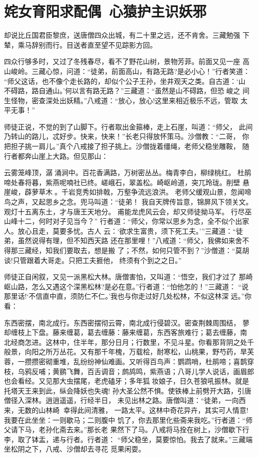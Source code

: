 \chapter{姹女育阳求配偶~心猿护主识妖邪}

却说比丘国君臣黎庶，送唐僧四众出城，有二十里之远，还不肯舍。三藏勉强
下辇，乘马辞别而行。目送者直至望不见踪影方回。

四众行够多时，又过了冬残春尽，看不了野花山树，景物芳菲。前面又见一座
高山峻岭。三藏心惊，问道：“徒弟，前面高山，有路无路?是必小心！”行者笑道：
“师父这话，也不像个走长路的，却似个公子王孙，坐井观天之类。自古道：‘山
不碍路，路自通山。’何以言有路无路？”三藏道：“虽然是山不碍路，但恐峻之
间生怪物，密查深处出妖精。”八戒道：“放心，放心!这里来相近极乐不远，管取
太平无事！”

师徒正说，不觉的到了山脚下。行者取出金箍棒，走上石崖，叫道：“师父，
此间乃转山的路儿，忒好步。快来，快来！”长老只得放怀策马。沙僧教：“二哥，
你把担子挑一肩儿。”真个八戒接了担子挑上。沙僧拢着缰绳，老师父稳坐雕鞍，
随行者都奔山崖上大路。但见那山：

云雾笼峰顶，潺涌涧中。百花香满路，万树密丛丛。梅青李白，柳绿桃红。
杜鹃啼处春将暮，紫燕呢喃社已终。嵯峨石，翠盖松。崎岖岭道，突兀玲珑。削壁
悬崖峻，薜萝草木。千岩竞秀如排戟，万壑争流远浪洪。
老师父缓观山景，忽闻啼鸟之声，又起思乡之念。兜马叫道：“徒弟！
我自天牌传旨意，锦屏风下领关文。
观灯十五离东土，才与唐王天地分。
甫能龙虎风云会，却又师徒拗马军。
行尽巫山峰十二，何时对子见当今？”
行者道：“师父，你常以思乡为念，全不似个出家人。放心且走，莫要多忧。古人
云：‘欲求生富贵，须下死工夫。’”三藏道：“徒弟，虽然说得有理，但不知西天路
还在那里哩！”八戒道：“师父，我佛如来舍不得那三藏经，知我们要取去，想是搬
了；不然，如何只管不到？”沙僧道：“莫胡谈!只管跟着大哥走。只把工夫捱他，
终须有个到之之日。”

师徒正自闲叙，又见一派黑松大林。唐僧害怕，又叫道：“悟空，我们才过了
那崎岖山路，怎么又遇这个深黑松林?是必在意。”行者道：“怕他怎的！”三藏道：
“说那里话!‘不信直中直，须防仁不仁。’我也与你走过好几处松林，不似这林深
远。”你看：

东西密摆，南北成行。东西密摆彻云霄，南北成行侵碧汉。密查荆棘周围结，
蓼却缠枝上下盘。藤来缠葛，葛去缠藤：藤来缠葛，东西客旅难行；葛去缠藤，南
北经商怎进。这林中，住半年，那分日月；行数里，不见斗星。你看那背阴之处千
般景，向阳之所万丛花。又有那千年槐，万载桧，耐寒松，山桃果，野芍药，旱芙
蓉，一攒攒密砌重堆，乱纷纷神仙难画。又听得百鸟声：鹦鹉哨，杜鹃啼；喜鹊穿
枝，乌鸦反哺；黄鹂飞舞，百舌调音；鹧鸪鸣，紫燕语；八哥儿学人说话，画眉郎
也会看经。又见那大虫摆尾，老虎磕牙；多年狐妆娘子，日久苍狼吼振林。就是
托塔天王来到此，纵会降妖也失魂!
孙大圣公然不惧。使铁棒上前劈开大路，引唐僧径入深林。逍逍遥遥，行经半日，
未见出林之路。唐僧叫道：“徒弟，一向西来，无数的山林崎，幸得此间清雅，
一路太平。这林中奇花异卉，其实可人情意!我要在此坐坐：一则歇马；二则腹中
饥了，你去那里化些斋来我吃。”行者道：“师父请下马，老孙化斋去来。”那长老
果然下了马。八戒将马拴在树上，沙僧歇下行李，取了钵盂，递与行者。行者道：
“师父稳坐，莫要惊怕。我去了就来。”三藏端坐松阴之下，八戒、沙僧却去寻花
觅果闲耍。

